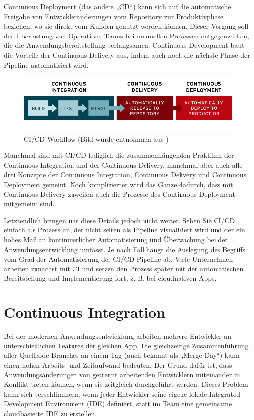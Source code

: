 Continuous Deployment (das andere „CD“) kann sich auf die automatische Freigabe von Entwickleränderungen vom Repository zur Produktivphase beziehen, wo sie direkt vom Kunden genutzt werden können. Dieser Vorgang soll der Überlastung von Operations-Teams bei manuellen Prozessen entgegenwirken, die die Anwendungsbereitstellung verlangsamen. Continuous Development baut die Vorteile der Continuous Delivery aus, indem auch noch die nächste Phase der Pipeline automatisiert wird.\autocite{whatIsCICD}

\begin{figure}[h]
	\centerline{
		\includegraphics[width=1\textwidth, frame]{./grafiken/ci-cd-flow-redhatsource.png}
	}
	\vskip0pt
	\caption{CI/CD Workflow (Bild wurde entnommen aus \cite{whatIsCICD})}
\end{figure}


Manchmal sind mit CI/CD lediglich die zusammenhängenden Praktiken der Continuous Integration und der Continuous Delivery, manchmal aber auch alle drei Konzepte der Continuous Integration, Continuous Delivery und Continuous Deployment gemeint. Noch komplizierter wird das Ganze dadurch, dass mit Continuous Delivery zuweilen auch die Prozesse des Continuous Deployment mitgemeint sind.\autocite{whatIsCICD}

Letztendlich bringen uns diese Details jedoch nicht weiter. Sehen Sie CI/CD einfach als Prozess an, der nicht selten als Pipeline visualisiert wird und der ein hohes Maß an kontinuierlicher Automatisierung und Überwachung bei der Anwendungsentwicklung umfasst. Je nach Fall hängt die Auslegung des Begriffs vom Grad der Automatisierung der CI/CD-Pipeline ab. Viele Unternehmen arbeiten zunächst mit CI und setzen den Prozess später mit der automatischen Bereitstellung und Implementierung fort, z. B. bei cloudnativen Apps.\autocite{whatIsCICD}

\section{Continuous Integration}

Bei der modernen Anwendungsentwicklung arbeiten mehrere Entwickler an unterschiedlichen Features der gleichen App. Die gleichzeitige Zusammenführung aller Quellcode-Branches an einem Tag (auch bekannt als „Merge Day“) kann einen hohen Arbeits- und Zeitaufwand bedeuten. Der Grund dafür ist, dass Anwendungsänderungen von getrennt arbeitenden Entwicklern miteinander in Konflikt treten können, wenn sie zeitgleich durchgeführt werden. Dieses Problem kann sich verschlimmern, wenn jeder Entwickler seine eigene lokale Integrated Development Environment (IDE) definiert, statt im Team eine gemeinsame cloudbasierte IDE zu erstellen.\autocite{whatIsCICD}

